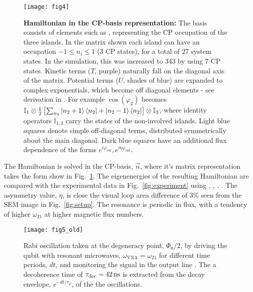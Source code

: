 \begin{figure}[ht]
  \centering \texttt{[image: fig4]}
  \caption{\small \textbf{Hamiltonian in the CP-basis representation:} The basis consists of elements such as , representing the CP occupation of the three islands. In the matrix shown each island can have an occupation $ -1 \le n_{i} \le 1$ (3 CP states), for a total of 27 system states. In the simulation, this was increased to 343 by using 7 CP states. Kinetic  terms ($ {T} $, purple) naturally fall on  the diagonal axis of  the matrix. Potential terms ($ U $, shades of blue) are expanded to complex exponentials, which become off diagonal elements - see derivation in \cite{phase}. For example $ \cos(\varphi_{2}) $ becomes $ \mathbb{I}_{1}\otimes\frac{1}{2}\left[\sum_{n_2}\ket{n_2+1}\bra{n_2} + \ket{n_2-1}\bra{n_2} \right]\otimes\mathbb{I}_{3}  $, where identity operators $ \mathbb{I}_{1,3} $ carry the states of the non-involved islands. Light blue squares denote simple off-diagonal terms, distributed symmetrically about the main diagonal. Dark blue squares have an additional flux dependence of the forms $e^{i\varphi_{\text{ext}}}, e^{i\eta\varphi_{\text{ext}}}$.
    \label{fig:matrix_representation} }
\end{figure}

The  Hamiltonian is  solved  in the  CP-basis, $\vec{n}  $,
where  it's matrix  representation takes  the form  show in
Fig.~\ref{fig:matrix_representation}.  The eigenenergies of
the   resulting   Hamiltonian   are   compared   with   the
experimental   data   in  Fig.~\ref{fig:experiment}   using
, , ,  .  The  asymmetry value,
$ \eta $, is close the visual loop area difference of 3\% seen
from the SEM image  in Fig.~\ref{fig:setup}.  The resonance
is   periodic  in   flux,   with  a   tendency  of   higher
$\omega_{21}$ at higher magnetic flux numbers.

 
 \begin{figure}[h]
   \texttt{[image: fig5\_old]}
   \caption{Rabi oscillation taken at the degeneracy point,
     $  \Phi_0/2  $,  by   driving  the  qubit  with  resonant
     microwaves,  $\omega_{\text{VNA}} =  \omega_{21}$ for  different
     time periods, $ dt $, and monitoring the signal in the
     output line  \cite{rabi}.  The  a decoherence  time of
     $ \tau_{\text{dec}} = 42\,\text{ns}  $ is extracted from
     the  decay  envelope,  $  e^{-dt/\tau_\varphi} $,  of  the  the
     oscillations. \label{fig:rabi}}
 \end{figure}
 
